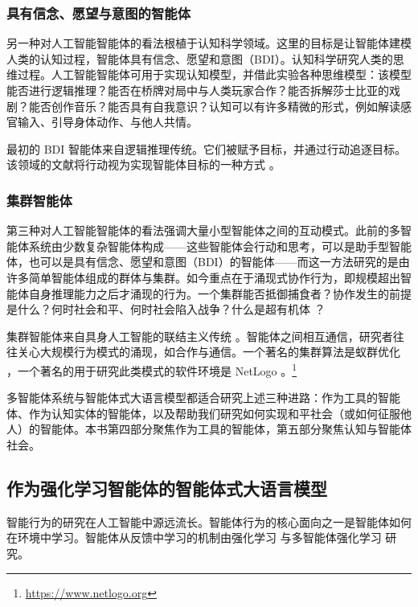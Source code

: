 \subsubsection{具有信念、愿望与意图的智能体}
另一种对人工智能智能体的看法根植于认知科学领域。这里的目标是让智能体建模人类的认知过程，智能体具有信念、愿望和意图（BDI）。认知科学研究人类的思维过程。人工智能智能体可用于实现认知模型，并借此实验各种思维模型：该模型能否进行逻辑推理？能否在桥牌对局中与人类玩家合作？能否拆解莎士比亚的戏剧？能否创作音乐？能否具有自我意识？认知可以有许多精微的形式，例如解读感官输入、引导身体动作、与他人共情。

最初的 BDI 智能体来自逻辑推理传统。它们被赋予目标，并通过行动追逐目标。该领域的文献将行动视为实现智能体目标的一种方式 \citep{rao1995bdi,georgeff1998belief}。

\subsubsection{集群智能体}
第三种对人工智能智能体的看法强调大量小型智能体之间的互动模式。此前的多智能体系统由少数复杂智能体构成——这些智能体会行动和思考，可以是助手型智能体，也可以是具有信念、愿望和意图（BDI）的智能体——而这一方法研究的是由许多简单智能体组成的群体与集群。如今重点在于涌现式协作行为，即规模超出智能体自身推理能力之后才涌现的行为。一个集群能否抵御捕食者？协作发生的前提是什么？何时社会和平、何时社会陷入战争？什么是超有机体 \citep{johnson2010deconstructing,wilson1989reviving}？

集群智能体来自具身人工智能的联结主义传统 \citep{brooks1990elephants}。智能体之间相互通信，研究者往往关心大规模行为模式的涌现，如合作与通信。一个著名的集群算法是蚁群优化 \citep{dorigo2007ant}，一个著名的用于研究此类模式的软件环境是 NetLogo \citep{wilensky2015introduction}。\footnote{\url{https://www.netlogo.org}}

多智能体系统与智能体式大语言模型都适合研究上述三种进路：作为工具的智能体、作为认知实体的智能体，以及帮助我们研究如何实现和平社会（或如何征服他人）的智能体。本书第四部分聚焦作为工具的智能体，第五部分聚焦认知与智能体社会。

\subsection{作为强化学习智能体的智能体式大语言模型}
智能行为的研究在人工智能中源远流长。智能体行为的核心面向之一是智能体如何在环境中学习。智能体从反馈中学习的机制由强化学习 \citep{sutton2018reinforcement} 与多智能体强化学习 \citep{wong2021multiagent} 研究。

